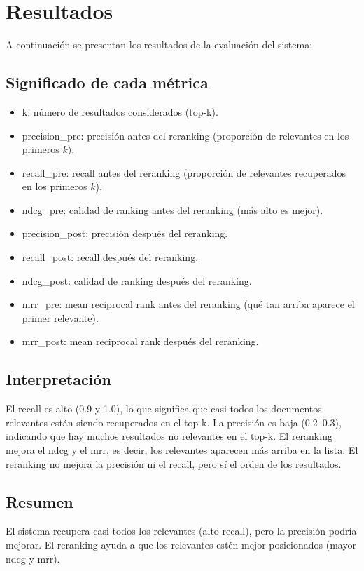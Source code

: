 \section{Resultados}

A continuación se presentan los resultados de la evaluación del sistema:

\begin{table}[h!]
\centering
{}
\caption{Métricas de evaluación para diferentes valores de $k$}
\end{table}
\subsection*{Significado de cada métrica}
\begin{itemize}
    \item k: número de resultados considerados (top-k).
    \item precision\_pre: precisión antes del reranking (proporción de relevantes en los primeros $k$).
    \item recall\_pre: recall antes del reranking (proporción de relevantes recuperados en los primeros $k$).
    \item ndcg\_pre: calidad de ranking antes del reranking (más alto es mejor).
    \item precision\_post: precisión después del reranking.
    \item recall\_post: recall después del reranking.
    \item ndcg\_post: calidad de ranking después del reranking.
    \item mrr\_pre: mean reciprocal rank antes del reranking (qué tan arriba aparece el primer relevante).
    \item mrr\_post: mean reciprocal rank después del reranking.
\end{itemize}

\subsection*{Interpretación}
El recall es alto (0.9 y 1.0), lo que significa que casi todos los documentos relevantes están siendo recuperados en el top-k. La precisión es baja (0.2–0.3), indicando que hay muchos resultados no relevantes en el top-k. El reranking mejora el ndcg y el mrr, es decir, los relevantes aparecen más arriba en la lista. El reranking no mejora la precisión ni el recall, pero sí el orden de los resultados.

\subsection*{Resumen}
El sistema recupera casi todos los relevantes (alto recall), pero la precisión podría mejorar. El reranking ayuda a que los relevantes estén mejor posicionados (mayor ndcg y mrr).